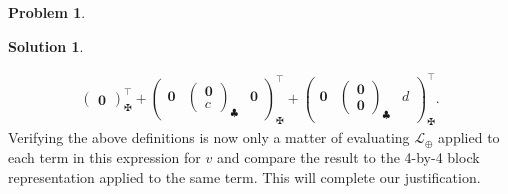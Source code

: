 \documentclass{article}
\theoremstyle{definition}
\newtheorem*{prob*}{Problem}
\newtheorem*{sln*}{Solution}
\newcommand{\lag}{\mathcal{L}}
\begin{document}
\begin{prob*}
\begin{sln*}
\begin{enumerate}
\begin{align*}
\begin{pmatrix}
		\mathbf{0}
		\end{pmatrix}^\top_\maltese
		+
		\begin{pmatrix}
		\mathbf{0} & \begin{pmatrix}
		\mathbf{0}\\c
		\end{pmatrix}_\clubsuit&
		\mathbf{0}
		\end{pmatrix}^\top_\maltese
		+
		\begin{pmatrix}
		\mathbf{0} & \begin{pmatrix}
		\mathbf{0}\\\mathbf{0}
		\end{pmatrix}_\clubsuit&
		d
		\end{pmatrix}^\top_\maltese.
		\end{align*}
		Verifying the above definitions is now only a matter of evaluating $\lag_\oplus$ applied to each term in this expression for $v$ and compare the result to the 4-by-4 block representation applied to the same term. This will complete our justification.
		
	\end{enumerate}
\end{sln*}
\end{prob*}




\newpage
\end{document}

